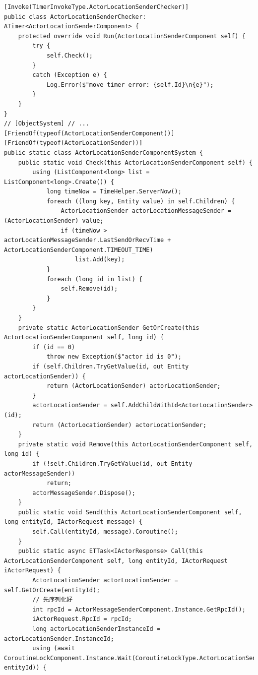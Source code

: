 \documentclass[9pt, b5paper]{article}
\begin{document}
\begin{verbatim}
[Invoke(TimerInvokeType.ActorLocationSenderChecker)]
public class ActorLocationSenderChecker: ATimer<ActorLocationSenderComponent> {
    protected override void Run(ActorLocationSenderComponent self) {
        try {
            self.Check();
        }
        catch (Exception e) {
            Log.Error($"move timer error: {self.Id}\n{e}");
        }
    }
}
// [ObjectSystem] // ...
[FriendOf(typeof(ActorLocationSenderComponent))]
[FriendOf(typeof(ActorLocationSender))]
public static class ActorLocationSenderComponentSystem {
    public static void Check(this ActorLocationSenderComponent self) {
        using (ListComponent<long> list = ListComponent<long>.Create()) {
            long timeNow = TimeHelper.ServerNow();
            foreach ((long key, Entity value) in self.Children) {
                ActorLocationSender actorLocationMessageSender = (ActorLocationSender) value;
                if (timeNow > actorLocationMessageSender.LastSendOrRecvTime + ActorLocationSenderComponent.TIMEOUT_TIME) 
                    list.Add(key);
            }
            foreach (long id in list) {
                self.Remove(id);
            }
        }
    }
    private static ActorLocationSender GetOrCreate(this ActorLocationSenderComponent self, long id) {
        if (id == 0) 
            throw new Exception($"actor id is 0");
        if (self.Children.TryGetValue(id, out Entity actorLocationSender)) {
            return (ActorLocationSender) actorLocationSender;
        }
        actorLocationSender = self.AddChildWithId<ActorLocationSender>(id);
        return (ActorLocationSender) actorLocationSender;
    }
    private static void Remove(this ActorLocationSenderComponent self, long id) {
        if (!self.Children.TryGetValue(id, out Entity actorMessageSender)) 
            return;
        actorMessageSender.Dispose();
    }
    public static void Send(this ActorLocationSenderComponent self, long entityId, IActorRequest message) {
        self.Call(entityId, message).Coroutine();
    }
    public static async ETTask<IActorResponse> Call(this ActorLocationSenderComponent self, long entityId, IActorRequest iActorRequest) {
        ActorLocationSender actorLocationSender = self.GetOrCreate(entityId);
        // 先序列化好
        int rpcId = ActorMessageSenderComponent.Instance.GetRpcId();
        iActorRequest.RpcId = rpcId;
        long actorLocationSenderInstanceId = actorLocationSender.InstanceId;
        using (await CoroutineLockComponent.Instance.Wait(CoroutineLockType.ActorLocationSender, entityId)) {

\end{verbatim}
\end{document}
